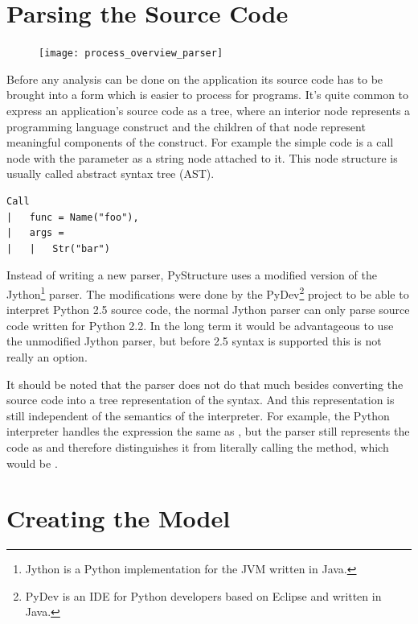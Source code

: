 \documentclass[12pt,halfparskip,DIV11,BCOR10mm]{scrreprt}
\begin{document}
\section{Parsing the Source Code}

\begin{figure}
		\vspace{-0.5cm}
    \texttt{[image: process\_overview\_parser]}
		\vspace{0cm}
\end{figure}

Before any analysis can be done on the application its source code has to be brought into a form which is easier to process for programs. It's quite common to express an application's source code as a tree, where an interior node represents a programming language construct and the children of that node represent meaningful components of the construct. For example the simple code  is a call node with the parameter as a string node attached to it. This node structure is usually called abstract syntax tree (AST).

\begin{lstlisting}
Call
|   func = Name("foo"),
|   args = 
|   |   Str("bar")
\end{lstlisting}

Instead of writing a new parser, PyStructure uses a modified version of the Jython\footnote{Jython is a Python implementation for the JVM written in Java.} parser. The modifications were done by the PyDev\footnote{PyDev is an IDE for Python developers based on Eclipse and written in Java.} project to be able to interpret Python 2.5 source code, the normal Jython parser can only parse source code written for Python 2.2. In the long term it would be advantageous to use the unmodified Jython parser, but before 2.5 syntax is supported this is not really an option.

It should be noted that the parser does not do that much besides converting the source code into a tree representation of the syntax. And this representation is still independent of the semantics of the interpreter. For example, the Python interpreter handles the expression  the same as , but the parser still represents the code as  and therefore distinguishes it from literally calling the  method, which would be .


\section{Creating the Model}
\end{document}
